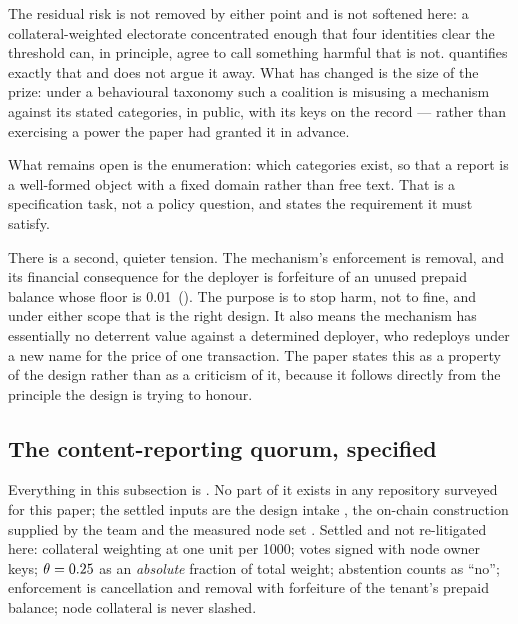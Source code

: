 \begin{remark}
The residual risk is not removed by either point and is not softened here: a collateral-weighted
electorate concentrated enough that four identities clear the threshold can, in principle, agree to
call something harmful that is not.  quantifies exactly that and does not
argue it away. What has changed is the size of the prize: under a behavioural taxonomy such a
coalition is misusing a mechanism against its stated categories, in public, with its keys on the
record --- rather than exercising a power the paper had granted it in advance.

What remains open is the enumeration: which categories exist, so that a report is a well-formed
object with a fixed domain rather than free text. That is a specification task, not a policy
question, and  states the requirement it must satisfy.
\end{remark}

There is a second, quieter tension. The mechanism's enforcement is removal, and its financial
consequence for the deployer is forfeiture of an unused prepaid balance whose floor is
\num{0.01}\flux\ (). The purpose is to stop harm, not to fine, and under
either scope that is the right design. It also means the mechanism has essentially no
deterrent value against a determined deployer, who redeploys under a new name for the price of one
transaction. The paper states this as a property of the design rather than as a criticism of it,
because it follows directly from the principle the design is trying to honour.

\subsection{The content-reporting quorum, specified}
\label{sec:23:mechanism}

Everything in this subsection is \planned. No part of it exists in any repository surveyed for this
paper; the settled inputs are the design intake , the
on-chain construction supplied by the team
 and the measured node set
. Settled and not re-litigated here:
collateral weighting at one unit per \num{1000}\flux; votes signed with node owner keys;
$\theta = 0.25$ as an \emph{absolute} fraction of total weight; abstention counts as ``no'';
enforcement is cancellation and removal with forfeiture of the tenant's prepaid balance; node
collateral is never slashed.

